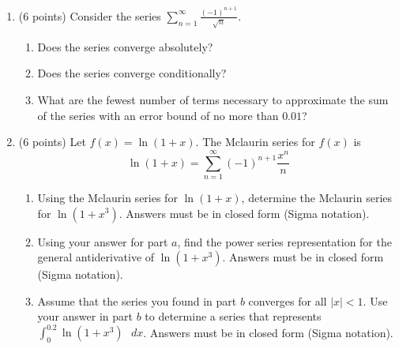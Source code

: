 \documentclass[paper=a4, fontsize=11pt]{scrartcl} %
\numberwithin{equation}{section} %
\numberwithin{figure}{section} %
\numberwithin{table}{section} %
\begin{document}
\begin{enumerate}
\newpage

\item (6 points) Consider the series $\sum\limits_{n=1}^\infty \frac{(-1)^{n+1}}{\sqrt{n}}$.
\begin{enumerate}
\item Does the series converge absolutely?
 \vspace{2in}
\item Does the series converge conditionally?
 \vspace{3in}
\item What are the fewest number of terms necessary to approximate the sum of the series with an error bound of no more than $0.01$?
\end{enumerate}

\newpage

\item (6 points) Let $f(x)=\ln (1+x)$.  The Mclaurin series for $f(x)$ is 
\begin{equation*}
\ln (1+x)= \sum\limits_{n=1}^\infty (-1)^{n+1} \frac{x^n}{n}
\end{equation*}
\begin{enumerate}
\item Using the Mclaurin series for $\ln (1+x)$, determine the Mclaurin series for $\ln (1+x^3)$.  Answers must be in closed form (Sigma notation).
\vspace{2in}
\item Using your answer for part $a$, find the power series representation for the general antiderivative of $\ln (1+x^3)$. Answers must be in closed form (Sigma notation).
\vspace{2in}
\item Assume that the series you found in part $b$ converges for all $|x| < 1$. Use your answer in part $b$ to determine a series that represents $\int_0^{0.2} \ln (1+x^3) \text{ } dx$. Answers must be in closed form (Sigma notation).
\end{enumerate}
\newpage


\end{enumerate}

\end{document}
